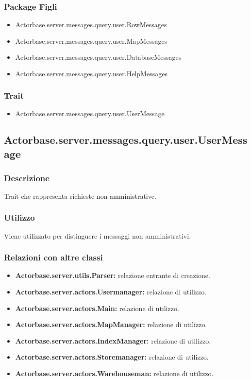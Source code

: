 \documentclass[a4paper]{article}
\begin{document}
			\subsubsection{Package Figli}
				\begin{itemize}
					\item Actorbase.server.messages.query.user.RowMessages
					\item Actorbase.server.messages.query.user.MapMessages
					\item Actorbase.server.messages.query.user.DatabaseMessages
					\item Actorbase.server.messages.query.user.HelpMessages
				\end{itemize}
				
			\subsubsection{Trait}
				\begin{itemize}
					\item Actorbase.server.messages.query.user.UserMessage
				\end{itemize}
				
		\subsection{Actorbase.server.messages.query.user.UserMessage}
			\subsubsection{Descrizione}
				Trait che rappresenta richieste non amministrative.
				
			\subsubsection{Utilizzo}
				Viene utilizzato per distinguere i messaggi non amministrativi. 
				
			\subsubsection{Relazioni con altre classi}
				\begin{itemize}
					\item \textbf{Actorbase.server.utils.Parser:} relazione entrante di creazione.
					\item \textbf{Actorbase.server.actors.Usermanager:} relazione di utilizzo.
					\item \textbf{Actorbase.server.actors.Main:} relazione di utilizzo.
					\item \textbf{Actorbase.server.actors.MapManager:} relazione di utilizzo.
					\item \textbf{Actorbase.server.actors.IndexManager:} relazione di utilizzo.
					\item \textbf{Actorbase.server.actors.Storemanager:} relazione di utilizzo.
					\item \textbf{Actorbase.server.actors.Warehouseman:} relazione di utilizzo.
				\end{itemize}
\end{document}
